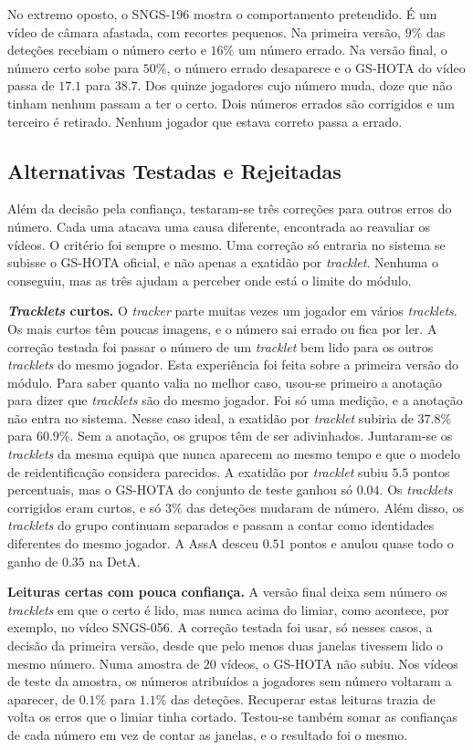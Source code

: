 No extremo oposto, o SNGS-196 mostra o comportamento pretendido. É um vídeo de câmara afastada, com recortes pequenos. Na primeira versão, $9\%$ das deteções recebiam o número certo e $16\%$ um número errado. Na versão final, o número certo sobe para $50\%$, o número errado desaparece e o GS-HOTA do vídeo passa de $17.1$ para $38.7$. Dos quinze jogadores cujo número muda, doze que não tinham nenhum passam a ter o certo. Dois números errados são corrigidos e um terceiro é retirado. Nenhum jogador que estava correto passa a errado.


\subsection{Alternativas Testadas e Rejeitadas}\label{sec:res_jnr_rejeitadas}

Além da decisão pela confiança, testaram-se três correções para outros erros do número. Cada uma atacava uma causa diferente, encontrada ao reavaliar os vídeos. O critério foi sempre o mesmo. Uma correção só entraria no sistema se subisse o GS-HOTA oficial, e não apenas a exatidão por \emph{tracklet}. Nenhuma o conseguiu, mas as três ajudam a perceber onde está o limite do módulo.

\medskip\noindent\textbf{\emph{Tracklets} curtos.} O \emph{tracker} parte muitas vezes um jogador em vários \emph{tracklets}. Os mais curtos têm poucas imagens, e o número sai errado ou fica por ler. A correção testada foi passar o número de um \emph{tracklet} bem lido para os outros \emph{tracklets} do mesmo jogador. Esta experiência foi feita sobre a primeira versão do módulo. Para saber quanto valia no melhor caso, usou-se primeiro a anotação para dizer que \emph{tracklets} são do mesmo jogador. Foi só uma medição, e a anotação não entra no sistema. Nesse caso ideal, a exatidão por \emph{tracklet} subiria de $37.8\%$ para $60.9\%$. Sem a anotação, os grupos têm de ser adivinhados. Juntaram-se os \emph{tracklets} da mesma equipa que nunca aparecem ao mesmo tempo e que o modelo de reidentificação considera parecidos. A exatidão por \emph{tracklet} subiu $5.5$ pontos percentuais, mas o GS-HOTA do conjunto de teste ganhou só $0.04$. Os \emph{tracklets} corrigidos eram curtos, e só $3\%$ das deteções mudaram de número. Além disso, os \emph{tracklets} do grupo continuam separados e passam a contar como identidades diferentes do mesmo jogador. A AssA desceu $0.51$ pontos e anulou quase todo o ganho de $0.35$ na DetA.

\medskip\noindent\textbf{Leituras certas com pouca confiança.} A versão final deixa sem número os \emph{tracklets} em que o certo é lido, mas nunca acima do limiar, como acontece, por exemplo, no vídeo SNGS-056. A correção testada foi usar, só nesses casos, a decisão da primeira versão, desde que pelo menos duas janelas tivessem lido o mesmo número. Numa amostra de $20$ vídeos, o GS-HOTA não subiu. Nos vídeos de teste da amostra, os números atribuídos a jogadores sem número voltaram a aparecer, de $0.1\%$ para $1.1\%$ das deteções. Recuperar estas leituras trazia de volta os erros que o limiar tinha cortado. Testou-se também somar as confianças de cada número em vez de contar as janelas, e o resultado foi o mesmo.

